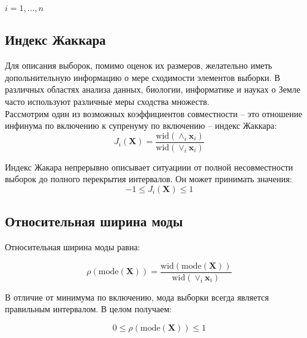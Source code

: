 $i = 1, \ldots, n$ \\

\subsection{Индекс Жаккара} 

Для описания выборок, помимо оценок их размеров, желательно иметь допольнительную информацию о мере сходимости элементов выборки. В различных областях анализа данных, биологии, информатике и науках о Земле часто используют различные меры сходства множеств. \\
Рассмотрим один из возможных коэффициентов совместности -- это отношение инфинума по включению к супренуму по включению -- индекс Жаккара: \\

\begin{equation}
	J_i(\bm{X}) = \dfrac{\text{wid}(\wedge_i \bm{x}_i)}{\text{wid} (\vee_i \bm{x}_i)}
\end{equation}

Индекс Жакара непрерывно описывает ситуациии от полной несовместности выборок до полного перекрытия интервалов. Он может принимать значения: 
\begin{equation*}
	 -1 \leq J_i(\bm{X}) \leq 1
\end{equation*}

\subsection{Относительная ширина моды}

Относительная ширина моды равна: 

\begin{equation}
		\rho(\text{mode}(\bm{X})) =\dfrac{\text{wid}(\text{mode}(\bm{X}))}{\text{wid} (\vee_i \bm{x}_i)}
\end{equation}

В отличие от минимума по включению, мода выборки всегда является правильным интервалом. В целом получаем: 

\begin{equation*}
	0 \leq \rho(\text{mode}(\bm{X})) \leq 1
\end{equation*}